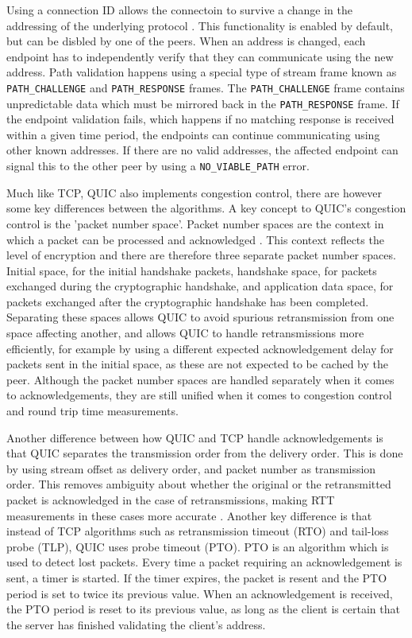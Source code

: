 Using a connection ID allows the connectoin to survive a change
in the addressing of the underlying protocol \cite{iyengarQUICUDPBasedMultiplexed2021}.
This functionality is enabled by default, but can be disbled by
one of the peers. When an address is changed, each endpoint has to
independently verify that they can communicate using the new address.
Path validation happens using a special type of stream frame
known as \texttt{PATH\_CHALLENGE} and \texttt{PATH\_RESPONSE}
frames. The \texttt{PATH\_CHALLENGE} frame contains unpredictable
data which must be mirrored back in the \texttt{PATH\_RESPONSE} frame.
If the endpoint validation fails, which happens if no matching response
is received within a given time period, the endpoints can continue
communicating using other known addresses. If there are no valid
addresses, the affected endpoint can signal this to the other
peer by using a \texttt{NO\_VIABLE\_PATH} error.

Much like TCP, QUIC also implements congestion control, there are
however some key differences between the algorithms. A key concept
to QUIC's congestion control is the 'packet number space'. Packet
number spaces are the context in which a packet can be processed
and acknowledged \cite{iyengarQUICUDPBasedMultiplexed2021}. 
This context reflects the level of encryption and there 
are therefore three separate packet number spaces. Initial space,
for the initial handshake packets, handshake space, for packets
exchanged during the cryptographic handshake, and application
data space, for packets exchanged after the cryptographic handshake
has been completed. Separating these spaces allows QUIC to
avoid spurious retransmission from one space affecting another,
and allows QUIC to handle retransmissions more efficiently, for
example by using a different expected acknowledgement delay for packets sent
in the initial space, as these are not expected to be cached
by the peer. Although the packet number spaces are handled
separately when it comes to acknowledgements, they are still
unified when it comes to congestion control and round trip
time measurements.

Another difference between how QUIC and TCP handle acknowledgements
is that QUIC separates the transmission order from the delivery order.
This is done by using stream offset as delivery order, and packet number as
transmission order. This removes ambiguity about whether the
original or the retransmitted packet is acknowledged in the case
of retransmissions, making RTT measurements in these cases more accurate
\cite{iyengarQUICUDPBasedMultiplexed2021}. Another key difference
is that instead of TCP algorithms such as retransmission timeout (RTO)
and tail-loss probe (TLP), QUIC uses probe timeout (PTO).
PTO is an algorithm which is used to detect lost packets. Every
time a packet requiring an acknowledgement is sent, a timer is started. If
the timer expires, the packet is resent and the PTO period is
set to twice its previous value. When an acknowledgement is received,
the PTO period is reset to its previous value, as long as the
client is certain that the server has finished validating the 
client's address.

